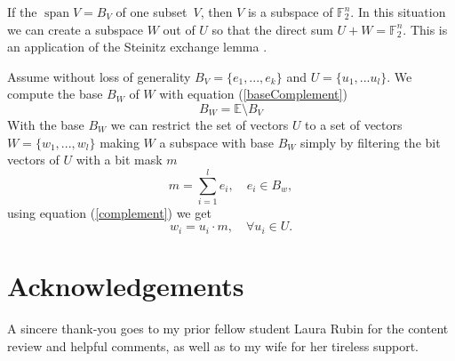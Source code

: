 \documentclass[a4paper]{article}
\newcommand{\BE}{\mathbb{E}}
\newcommand{\BF}{\mathbb{F}}
\newcommand{\0}{\mathbf{0}}
\newcommand{\1}{\mathbf{1}}
\begin{document}
If the $\operatorname{span}V = B_V$ of one
subset~$V$, then $V$ is a subspace of $\BF_2^n$. In this situation we can create a subspace $W$ out of $U$ so that the direct sum
$U + W = \BF_2^n$. This is an application of the Steinitz exchange lemma \cite{Fischer2020, wikipedia_en_2026_SteinitzExchangeLemma}.

Assume without loss of generality $B_V = \{e_1, ..., e_k\}$ and $U = \{u_1, ... u_l\}$.
We compute the base $B_W$ of $W$ with equation (\ref{baseComplement})
\begin{equation}
	B_W = \BE \setminus B_V
	\label{baseComplement}
\end{equation}
With the base $B_W$ we can restrict the set of vectors $U$ to a set of vectors $W = \{w_1, ..., w_l\}$
making $W$ a subspace with base $B_W$ simply by filtering the bit vectors of $U$ with a bit mask $m$
\begin{equation}
	m = \sum_{i=1}^l e_i, \quad e_i \in B_w,
\end{equation}
using equation (\ref{complement}) we get
\begin{equation}
	w_i = u_i \cdot m, \quad \forall u_i \in U.
	\label{complement}
\end{equation}

%
%
%
%
%
\section*{Acknowledgements}

A sincere thank‑you goes to my prior fellow student Laura Rubin for the content review and helpful comments, as well as to my wife for her tireless support.


\printbibliography
\end{document}
